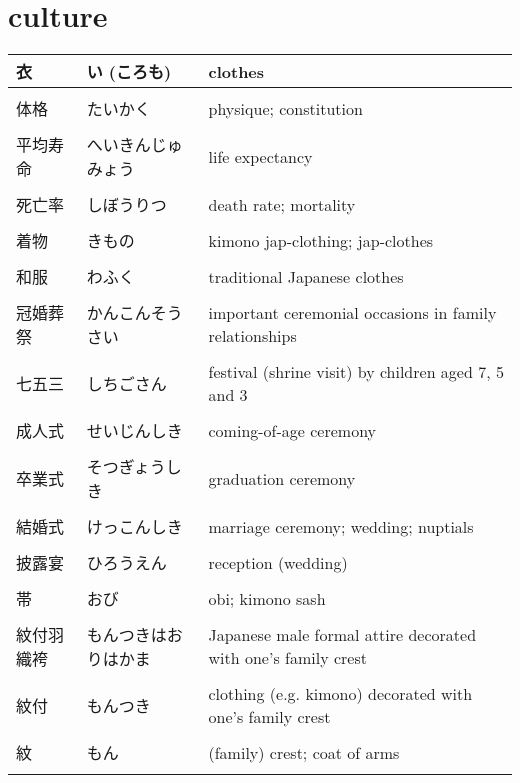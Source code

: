 \documentclass{article}
\newcommand\tabni[1][0.2cm]{\hspace*{#1}}
\begin{document}
\section{ \tabni culture }
\begin{tabular}{ l | l | p{11.5cm} }
衣 & い (ころも) & clothes \\ \hline \\[-1em]
体格 &  たいかく  & physique; constitution \\ \hline \\[-1em]
平均寿命&  へいきんじゅみょう & life expectancy \\ \hline \\[-1em]
死亡率 &  しぼうりつ  & death rate; mortality  \\ \hline \\[-1em]
着物 &  きもの & kimono jap-clothing; jap-clothes  \\ \hline \\[-1em]
和服 &  わふく & traditional Japanese clothes \\ \hline \\[-1em]
冠婚葬祭 &  かんこんそうさい & important ceremonial occasions in family relationships \\ \hline \\[-1em]
七五三 & しちごさん & festival (shrine visit) by children aged 7, 5 and 3 \\ \hline \\[-1em]
成人式 &  せいじんしき & coming-of-age ceremony \\ \hline \\[-1em]
卒業式 & そつぎょうしき & graduation ceremony \\ \hline \\[-1em]
結婚式 &  けっこんしき & marriage ceremony; wedding; nuptials \\ \hline \\[-1em]
披露宴 &   ひろうえん  & reception (wedding) \\ \hline \\[-1em]
帯 & おび & obi; kimono sash  \\ \hline \\[-1em]
紋付羽織袴 &もんつきはおりはかま& Japanese male formal attire decorated with one's family crest \\ \hline \\[-1em]
紋付& もんつき &clothing (e.g. kimono) decorated with one's family crest \\ \hline \\[-1em]
紋&もん&(family) crest; coat of arms \\ \hline \\[-1em]

\end{tabular}
\end{document}
